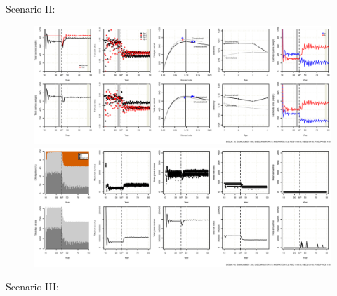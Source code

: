 \documentclass[12pt,oneline,a4paper,numbib]{ouparticle}
\numberwithin{equation}{subsection} %
\begin{document}
Scenario II:
\begin{figure}[!h]
\centering
\begin{minipage}{.45\textwidth}
\includegraphics[width=0.9\textheight, angle=90]{Figures/Catch_LO.eps} 
\end{minipage}
\hfill
\begin{minipage}{.45\textwidth}
\includegraphics[width=0.9\textheight, angle=90]{Figures/Effort_LO.eps} 
\end{minipage}
\caption{}
\end{figure}


Scenario III:
\end{document}
